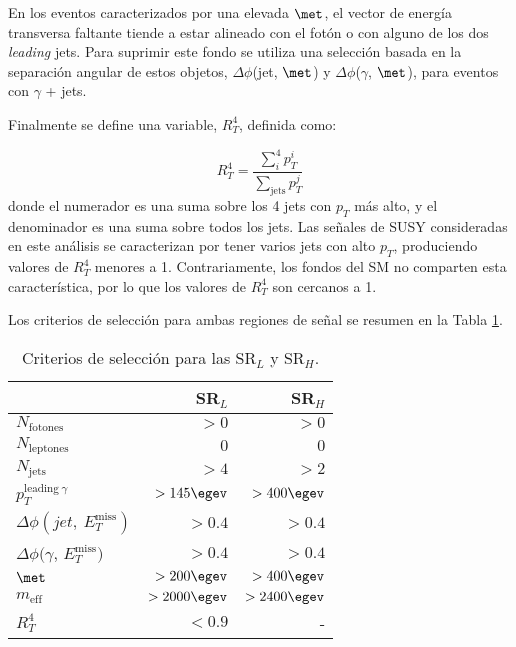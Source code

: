 En los eventos caracterizados por una elevada $\met$, el vector de energía transversa faltante tiende a estar alineado con el fotón o con alguno de los dos \textit{leading} jets. Para suprimir este fondo se utiliza una selección basada en la separación angular de estos objetos, $\Delta\phi$(jet, $\met$) y $\Delta\phi$($\gamma$, $\met$), para eventos con $\gamma$ + jets.

Finalmente se define una variable, $R_{T}^{4}$, definida como:

\begin{equation}
R_{T}^{4}=\frac{\sum_{i}^{4}p_{T}^{i}}{\sum_{\text{jets}}p_{T}^{j}}
\end{equation}
donde el numerador es una suma sobre los 4 jets con $p_{T}$ más alto, y el denominador es una suma sobre todos los jets. Las señales de SUSY consideradas en este análisis se caracterizan por tener varios jets con alto $p_{T}$, produciendo valores de $R_{T}^{4}$ menores a 1. Contrariamente, los fondos del SM no comparten esta característica, por lo que los valores de $R_{T}^{4}$ son cercanos a 1.

Los criterios de selección para ambas regiones de señal se resumen en la Tabla \ref{srs}.

\begin{table}
\centering
\caption{Criterios de selección para las SR$_{L}$ y SR$_{H}$. }
\begin{tabular}{ l | r | r }

	\hline

	& SR$_{L}$ & SR$_{H}$ \\

	\hline

	$N_{\text{fotones}}$ 	& $> 0$ 	& $> 0$ \\

	$N_{\text{leptones}}$ 	& $0$ 	& $0$ \\

	$N_{\text{jets}}$ 	& $>4$ 	& $>2$ \\

	$p_{T}^{\text{leading}\: \gamma}$ 	& $> 145 \egev$ 	& $> 400 \egev$ \\

	$\Delta\phi(jet,\: E_{T}^{\text{miss}})$ 	& $> 0.4$ 	& $> 0.4$ \\

	$\Delta\phi(\gamma$,\: $E_{T}^{\text{miss}})$ 	& $>0.4$ 	& $>0.4$ \\

	$\met$ 	& $>200\egev$ 	& $>400\egev$ \\

	$m_{\text{eff}}$ 	& $> 2000 \egev$ 	& $> 2400 \egev$ \\

	$R_{T}^{4}$ 	& $< 0.9$ 	& - \\

	\hline


\end{tabular}
\label{srs}
\end{table}

